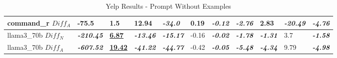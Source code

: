 \documentclass[a4paper,twoside]{article}
\begin{document}
\begin{table}[ht]
{\begin{tabular}{lllllllllll}
            command\_r $Diff_A$  & -75.5                     & 1.5                        & 12.94                    & \textbf{\textit{-34.0}}  & 0.19      & \textbf{\textit{-0.12}} & \textbf{\textit{-2.76}} & 2.83                    & \textbf{\textit{-20.49}}   & \textbf{\textit{-4.76}}  \\ \midrule
            llama3\_70b $Diff_N$ & \textbf{\textit{-210.45}} & \textbf{\underline{6.87}}  & \textbf{\textit{-13.46}} & \textbf{\textit{-15.17}} & -0.16     & \textbf{\textit{-0.02}} & \textbf{\textit{-1.78}} & \textbf{\textit{-1.31}} & 3.7                        & \textbf{\textit{-1.58}}  \\ \midrule
            llama3\_70b $Diff_A$ & \textbf{\textit{-607.52}} & \textbf{\underline{19.42}} & \textbf{\textit{-41.22}} & \textbf{\textit{-44.77}} & -0.42     & \textbf{\textit{-0.05}} & \textbf{\textit{-5.48}} & \textbf{\textit{-4.34}} & 9.79                       & \textbf{\textit{-4.98}}  \\ \bottomrule
        \end{tabular}%
    }
    \caption{Yelp Results - Prompt Without Examples}\label{table-prompt-1-yelp} %
\end{table}
\end{document}
